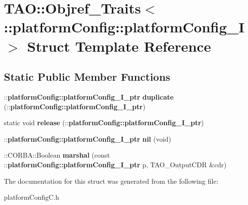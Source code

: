 \section{T\+AO\+:\+:Objref\+\_\+\+Traits$<$ \+:\+:platform\+Config\+:\+:platform\+Config\+\_\+I $>$ Struct Template Reference}
\label{structTAO_1_1Objref__Traits_3_01_1_1platformConfig_1_1platformConfig__I_01_4}
\subsection*{Static Public Member Functions}
\begin{DoxyCompactItemize}
\item 
\+::{\bf platform\+Config\+::platform\+Config\+\_\+\+I\+\_\+ptr} {\bfseries duplicate} (\+::{\bf platform\+Config\+::platform\+Config\+\_\+\+I\+\_\+ptr})\label{structTAO_1_1Objref__Traits_3_01_1_1platformConfig_1_1platformConfig__I_01_4_a0d31abf9e35ae66b434289e3546b7b9e}

\item 
static void {\bfseries release} (\+::{\bf platform\+Config\+::platform\+Config\+\_\+\+I\+\_\+ptr})\label{structTAO_1_1Objref__Traits_3_01_1_1platformConfig_1_1platformConfig__I_01_4_a45b9ab3973eb936c8f0eb90b4c8f2a92}

\item 
\+::{\bf platform\+Config\+::platform\+Config\+\_\+\+I\+\_\+ptr} {\bfseries nil} (void)\label{structTAO_1_1Objref__Traits_3_01_1_1platformConfig_1_1platformConfig__I_01_4_aaf363e3f748fb1fe078d6df225b1115b}

\item 
\+::C\+O\+R\+B\+A\+::\+Boolean {\bfseries marshal} (const \+::{\bf platform\+Config\+::platform\+Config\+\_\+\+I\+\_\+ptr} p, T\+A\+O\+\_\+\+Output\+C\+DR \&cdr)\label{structTAO_1_1Objref__Traits_3_01_1_1platformConfig_1_1platformConfig__I_01_4_ac06ef09ccfd621e766615bd8783a0313}

\end{DoxyCompactItemize}


The documentation for this struct was generated from the following file\+:\begin{DoxyCompactItemize}
\item 
platform\+Config\+C.\+h\end{DoxyCompactItemize}
